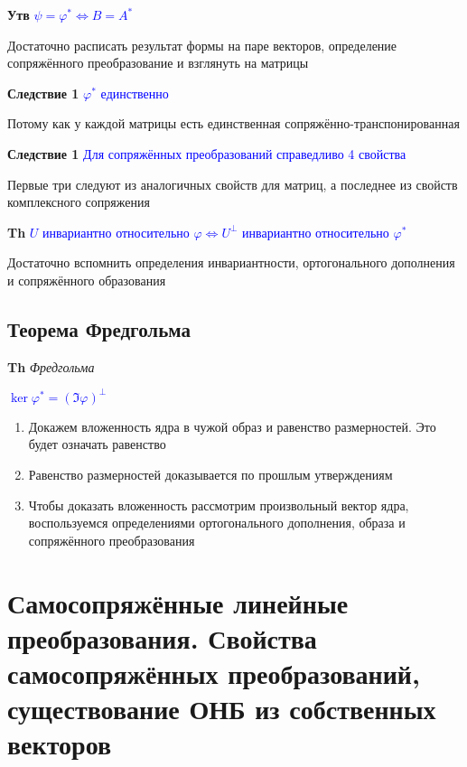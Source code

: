 \documentclass[a4paper, 14pt]{article}
\begin{document}
    
    \textbf{Утв} \textcolor{blue}{$\psi = \varphi^* \Leftrightarrow B = A^*$}
    
    Достаточно расписать результат формы на паре векторов, определение сопряжённого преобразование и взглянуть на
    матрицы
    
    \textbf{Следствие 1} \textcolor{blue}{$\varphi^*$ единственно}
    
    Потому как у каждой матрицы есть единственная сопряжённо-транспонированная
    
    \textbf{Следствие 1} \textcolor{blue}{Для сопряжённых преобразований справедливо 4 свойства}
    
    Первые три следуют из аналогичных свойств для матриц, а последнее из свойств комплексного сопряжения
    
    \textbf{Th} \textcolor{blue}{$U$ инвариантно относительно $\varphi \Leftrightarrow U^\bot$ инвариантно
    относительно $\varphi^*$}
    
    Достаточно вспомнить определения инвариантности, ортогонального дополнения и сопряжённого образования
    
    \subsection{Теорема Фредгольма}
    
    \textbf{Th} \textit{Фредгольма}
    
    \textcolor{blue}{$\ker \varphi^* = (\Im \varphi)^\bot$}
    
    \begin{enumerate}
        \item Докажем вложенность ядра в чужой образ и равенство размерностей.
        Это будет означать равенство
        \item Равенство размерностей доказывается по прошлым утверждениям
        \item Чтобы доказать вложенность рассмотрим произвольный вектор ядра, воспользуемся определениями
        ортогонального дополнения, образа и сопряжённого преобразования
    \end{enumerate}
    
    \section{Самосопряжённые линейные преобразования.
    Свойства самосопряжённых преобразований, существование ОНБ из собственных векторов}
    
\end{document}
